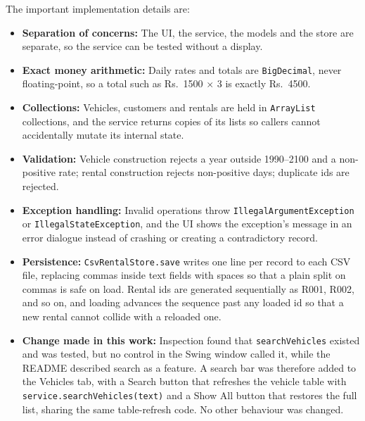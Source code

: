 \documentclass[11pt,a4paper]{article}
\begin{document}
The important implementation details are:

\begin{itemize}
  \item \textbf{Separation of concerns:} The UI, the service, the
        models and the store are separate, so the service can be
        tested without a display.
  \item \textbf{Exact money arithmetic:} Daily rates and totals are
        \texttt{BigDecimal}, never floating-point, so a total such
        as Rs.\ 1500 $\times$ 3 is exactly Rs.\ 4500.
  \item \textbf{Collections:} Vehicles, customers and rentals are
        held in \texttt{ArrayList} collections, and the service
        returns copies of its lists so callers cannot accidentally
        mutate its internal state.
  \item \textbf{Validation:} Vehicle construction rejects a year
        outside 1990--2100 and a non-positive rate; rental
        construction rejects non-positive days; duplicate ids are
        rejected.
  \item \textbf{Exception handling:} Invalid operations throw
        \texttt{IllegalArgumentException} or
        \texttt{IllegalStateException}, and the UI shows the
        exception's message in an error dialogue instead of
        crashing or creating a contradictory record.
  \item \textbf{Persistence:} \texttt{CsvRentalStore.save} writes
        one line per record to each CSV file, replacing commas
        inside text fields with spaces so that a plain split on
        commas is safe on load. Rental ids are generated
        sequentially as R001, R002, and so on, and loading advances
        the sequence past any loaded id so that a new rental cannot
        collide with a reloaded one.
  \item \textbf{Change made in this work:} Inspection found that
        \texttt{searchVehicles} existed and was tested, but no
        control in the Swing window called it, while the README
        described search as a feature. A search bar was therefore
        added to the Vehicles tab, with a Search button that
        refreshes the vehicle table with
        \texttt{service.searchVehicles(text)} and a Show All button
        that restores the full list, sharing the same table-refresh
        code. No other behaviour was changed.
\end{itemize}

\end{document}

